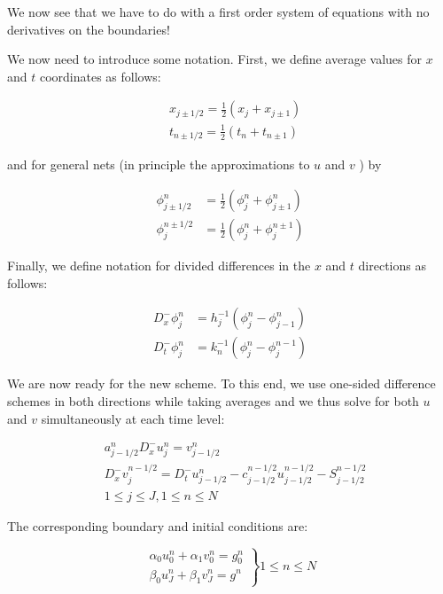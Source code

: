 \documentclass[10pt]{article}
\begin{document}
We now see that we have to do with a first order system of equations with no derivatives on the boundaries!

We now need to introduce some notation. First, we define average values for $x$ and $t$ coordinates as follows:

$$
\begin{aligned}
& x_{j \pm 1 / 2}=\frac{1}{2}\left(x_{j}+x_{j \pm 1}\right) \\
& t_{n \pm 1 / 2}=\frac{1}{2}\left(t_{n}+t_{n \pm 1}\right)
\end{aligned}
$$

and for general nets (in principle the approximations to $u$ and $v$ ) by

$$
\begin{aligned}
\phi_{j \pm 1 / 2}^{n} & =\frac{1}{2}\left(\phi_{j}^{n}+\phi_{j \pm 1}^{n}\right) \\
\phi_{j}^{n \pm 1 / 2} & =\frac{1}{2}\left(\phi_{j}^{n}+\phi_{j}^{n \pm 1}\right)
\end{aligned}
$$

Finally, we define notation for divided differences in the $x$ and $t$ directions as follows:

$$
\begin{aligned}
D_{x}^{-} \phi_{j}^{n} & =h_{j}^{-1}\left(\phi_{j}^{n}-\phi_{j-1}^{n}\right) \\
D_{t}^{-} \phi_{j}^{n} & =k_{n}^{-1}\left(\phi_{j}^{n}-\phi_{j}^{n-1}\right)
\end{aligned}
$$

We are now ready for the new scheme. To this end, we use one-sided difference schemes in both directions while taking averages and we thus solve for both $u$ and $v$ simultaneously at each time level:


\begin{align*}
& a_{j-1 / 2}^{n} D_{x}^{-} u_{j}^{n}=v_{j-1 / 2}^{n} \\
& D_{x}^{-} v_{j}^{n-1 / 2}=D_{t}^{-} u_{j-1 / 2}^{n}-c_{j-1 / 2}^{n-1 / 2} u_{j-1 / 2}^{n-1 / 2}-S_{j-1 / 2}^{n-1 / 2}  \tag{21}\\
& 1 \leq j \leq J, 1 \leq n \leq N
\end{align*}


The corresponding boundary and initial conditions are:

\[
\left.\begin{array}{l}
\alpha_{0} u_{0}^{n}+\alpha_{1} v_{0}^{n}=g_{0}^{n}  \tag{22}\\
\beta_{0} u_{J}^{n}+\beta_{1} v_{J}^{n}=g^{n}
\end{array}\right\} 1 \leq n \leq N
\]
\end{document}
